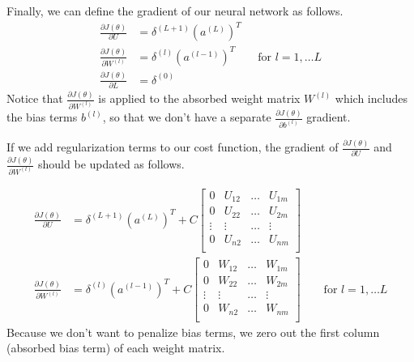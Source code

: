 \documentclass[letterpaper]{article}
\begin{document}
Finally, we can define the gradient of our neural network as follows.
\begin{equation}\label{eq:grad}
\begin{split}
\frac{\partial J(\theta)}{\partial U} &
= \delta^{(L+1)} (a^{(L)})^T \\
\frac{\partial J(\theta)}{\partial W^{(l)}} &
= \delta^{(l)}(a^{(l-1)})^T \qquad \textrm{for } l = 1, \dots L \\
\frac{\partial J(\theta)}{\partial L} &
= \delta^{(0)}
\end{split}
\end{equation}
Notice that $\frac{\partial J(\theta)}{\partial W^{(l)}}$ is applied to the absorbed weight matrix $W^{(l)}$ which includes the bias terms $b^{(l)}$, so that we don't have a separate $\frac{\partial J(\theta)}{\partial b^{(l)}}$ gradient.

\vspace{0.1cm}

If we add regularization terms to our cost function, the gradient of $\frac{\partial J(\theta)}{\partial U}$ and  $\frac{\partial J(\theta)}{\partial W^{(l)}}$ should be updated as follows.

\begin{equation}
\begin{split}
\frac{\partial J(\theta)}{\partial U} &
= \delta^{(L+1)} (a^{(L)})^T + C 
\begin{bmatrix}
0 & U_{12} & \dots & U_{1m} \\
0 & U_{22} & \dots & U_{2m} \\
\vdots & \vdots & \dots & \vdots  \\
0 & U_{n2} & \dots & U_{nm} \\
\end{bmatrix} \\
\frac{\partial J(\theta)}{\partial W^{(l)}} &
= \delta^{(l)}(a^{(l-1)})^T + C
\begin{bmatrix}
0 & W_{12} & \dots & W_{1m} \\
0 & W_{22} & \dots & W_{2m} \\
\vdots & \vdots & \dots & \vdots  \\
0 & W_{n2} & \dots & W_{nm} \\
\end{bmatrix}
\qquad \textrm{for } l = 1, \dots L
\end{split}
\end{equation}
Because we don't want to penalize bias terms, we zero out the first column (absorbed bias term) of each weight matrix.
\end{document}
